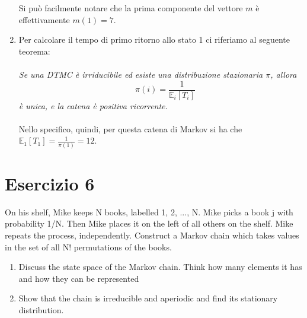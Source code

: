 \documentclass[
	12pt, %
]{fphw}
\begin{document}
\begin{enumerate}
\begin{matlaboutput}
		\end{matlaboutput}
	
	Si può facilmente notare che la prima componente del vettore $m$ è effettivamente $m(1) = 7$.
	\item Per calcolare il tempo di primo ritorno allo stato 1 ci riferiamo al seguente teorema:\\
	\\
	\null\quad \textit{Se una DTMC è irriducibile ed esiste una distribuzione stazionaria $\pi$, allora
	\begin{equation*}
		\quad\pi(i) = \frac{1}{\mathbb{E}_i [T_i]}
	\end{equation*}
	\null\quad è unica, e la catena è positiva ricorrente.}\\
	\\
	Nello specifico, quindi, per questa catena di Markov si ha che $\mathbb{E}_1 [T_1] = \frac{1}{\pi(1)} = 12$.
\end{enumerate}


\newpage
\section*{Esercizio 6}

\begin{problem}
	\smallskip
	On his shelf, Mike keeps N books, labelled 1, 2, ..., N. Mike picks
	a book j with probability 1/N. Then Mike places it on the left of all
	others on the shelf. Mike repeats the process, independently. Construct
	a Markov chain which takes values in the set of all N! permutations of
	the books.
	\begin{enumerate}
		\item Discuss the state space of the Markov chain. Think how many
		elements it has and how they can be represented
		\item Show that the chain is irreducible and aperiodic and find its
		stationary distribution.		
	\end{enumerate}
	\smallskip
\end{problem}
	
\end{document}
